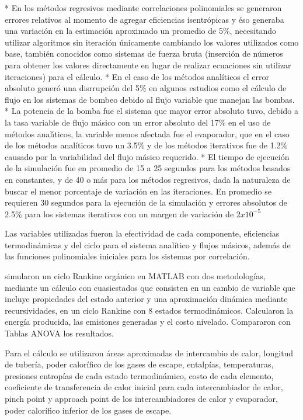 \begin{markdown}
* En los métodos regresivos mediante correlaciones polinomiales se generaron errores relativos al momento de agregar eficiencias isentrópicas y éso generaba una variación en la estimación aproximado un promedio de 5\%, necesitando utilizar algoritmos sin iteración únicamente cambiando los valores utilizados como base, también conocidos como sistemas de fuerza bruta (inserción de números para obtener los valores directamente en lugar de realizar ecuaciones sin utilizar iteraciones) para el cálculo.
* En el caso de los métodos analíticos el error absoluto generó una disrrupción del 5\% en algunos estudios como el cálculo de flujo en los sistemas de bombeo debido al flujo variable que manejan las bombas.
* La potencia de la bomba fue el sistema que mayor error absoluto tuvo, debido a la tasa variable de flujo másico con un error absoluto del 17\% en el uso de métodos analı́ticos, la variable menos afectada fue el evaporador, que en el caso de los métodos analíticos tuvo un 3.5\% y de los métodos iterativos fue de 1.2\% causado por la variabilidad del flujo másico requerido.
* El tiempo de ejecución de la simulación fue en promedio de 15 a 25 segundos para los métodos basados en constantes, y de 40 o más para los métodos regresivos, dada la naturaleza de buscar el menor porcentaje de variación en las iteraciones. En promedio se requieren 30 segundos para la ejecución de la simulación y errores absolutos de 2.5\% para los sistemas iterativos con un margen de variación de $2x10^{-5}$ 
\end{markdown}

Las variables utilizadas fueron la efectividad de cada componente, eficiencias termodinámicas y del ciclo para el sistema analítico y flujos másicos, además de las funciones polinomiales iniciales para los sistemas por correlación.

\cite{PILI2019619} simularon un ciclo Rankine orgánico en MATLAB con dos metodologías, mediante un cálculo con cuasiestados que consisten en un cambio de variable que incluye propiedades del estado anterior y una aproximación dinámica mediante recursividades, en un ciclo Rankine con 8 estados termodinámicos. Calcularon la energía producida, las emisiones generadas y el costo nivelado. Compararon con Tablas ANOVA los resultados.

Para el cálculo se utilizaron áreas aproximadas de intercambio de calor, longitud de tubería, poder calorífico de los gases de escape, entalpías, temperaturas, presiones entropías de cada estado termodinámico, costo de cada elemento, coeficiente de transferencia de calor inicial para cada intercambiador de calor, pinch point y approach point de los intercambiadores de calor y evaporador, poder calorífico inferior de los gases de escape.

